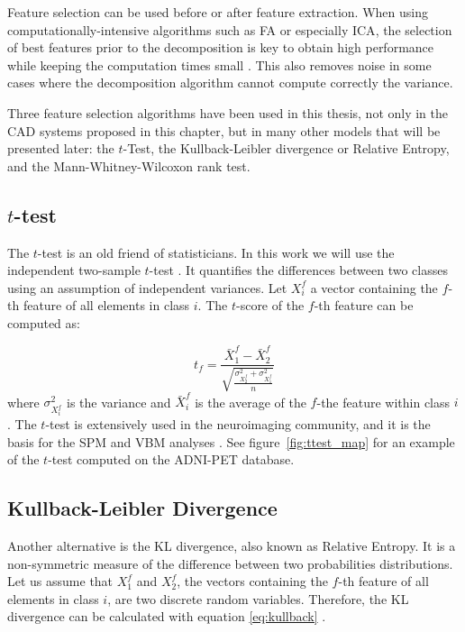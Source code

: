 Feature selection can be used before or after feature extraction. When using computationally-intensive algorithms such as \ac{FA} or especially \ac{ICA}, the selection of best features prior to the decomposition is key to obtain high performance while keeping the computation times small \cite{Martinez201141,Martinez-Murcia20129676}. This also removes noise in some cases where the decomposition algorithm cannot compute correctly the variance. 

Three feature selection algorithms have been used in this thesis, not only in the \ac{CAD} systems proposed in this chapter, but in many other models that will be presented later: the $t$-Test, the Kullback-Leibler divergence or Relative Entropy, and the Mann-Whitney-Wilcoxon rank test. 

\subsection{$t$-test}
The $t$-test is an old friend of statisticians. In this work we will use the independent two-sample $t$-test \cite{Fay10}. It quantifies the differences between two classes using an assumption of independent variances. Let $X_i^f$ a vector containing the $f$-th feature of all elements in class $i$. The $t$-score of the $f$-th feature can be computed as:

\begin{equation}
t_f = \frac{\bar{X}_1^f - \bar{X}_2^f}{\sqrt{\frac{\sigma_{X_2^f}^2+\sigma_{X_1^f}^2}{n}}}
\end{equation}
where $\sigma_{X_i^f}^2$ is the variance and $\bar{X}_i^f$ is the average of the $f$-the feature within class $i$. The $t$-test is extensively used in the neuroimaging community, and it is the basis for the \ac{SPM} and \ac{VBM} analyses \cite{spm_book}. See figure~\ref{fig:ttest_map} for an example of the $t$-test computed on the ADNI-PET database.

\subsection{Kullback-Leibler Divergence} 
Another alternative is the \acf{KL} divergence, also known as Relative Entropy. It is a non-symmetric measure of the difference between two probabilities distributions. Let us assume that $X_1^f$ and $X_2^f$, the vectors containing the $f$-th feature of all elements in class $i$, are two discrete random variables. Therefore, the \ac{KL} divergence can be calculated with equation \ref{eq:kullback} \cite{Theodoridis1999}.

